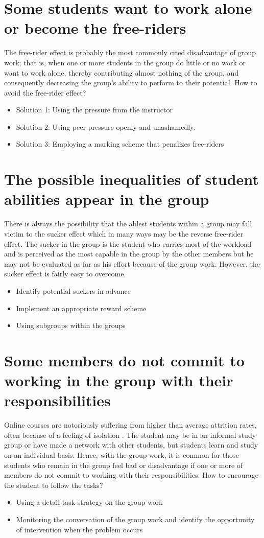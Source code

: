 \documentclass[letterpaper%
, twoside%
, 12pt%
,these%
, english%
,creativecommons,hyperref, withAlgo2e %
]{thETS}
\begin{document}
\section{Some students want to work alone or become the free-riders}
The free-rider effect \cite{Kerr} is probably the most commonly cited disadvantage of group work; that
is, when one or more students in the group do little or no work or want to work alone, thereby contributing almost nothing of the group, and consequently decreasing the group’s ability to perform to their potential. How to avoid the free-rider effect?
\begin{itemize}
	\item Solution 1: Using the pressure from the instructor
	\item Solution 2: Using peer pressure openly and unashamedly. 
	\item Solution 3: Employing a marking scheme that penalizes free-riders
\end{itemize}
\section{The possible inequalities of student abilities appear in the group}
There is always the possibility that the ablest students within a group may fall victim to the sucker effect which in many ways may be the reverse free-rider effect. The sucker in the group is the student who carries most of the workload and is perceived as the most capable in the group by the other members but he may not be evaluated as far as his effort because of the group work. However, the sucker effect is fairly easy to overcome. 
\begin{itemize}
	\item Identify potential suckers in advance
	\item Implement an appropriate reward scheme
	\item Using subgroups within the groups 
\end{itemize}
\section{Some members do not commit to working in the group with their responsibilities}
Online courses are notoriously suffering from higher than average attrition rates, often because of a feeling of isolation \cite{Hara}. The student may be in an informal study group or have made a network with other students, but students learn and study on an individual basis. Hence, with the group work, it is common for those students who remain in the group feel bad or disadvantage if one or more of members do not commit to working with their responsibilities. How to encourage the student to follow the tasks?
\begin{itemize}
	\item Using a detail task strategy on the group work
	\item Monitoring the conversation of the group work and identify the opportunity of intervention when the problem occurs
\end{itemize} 
\end{document}
